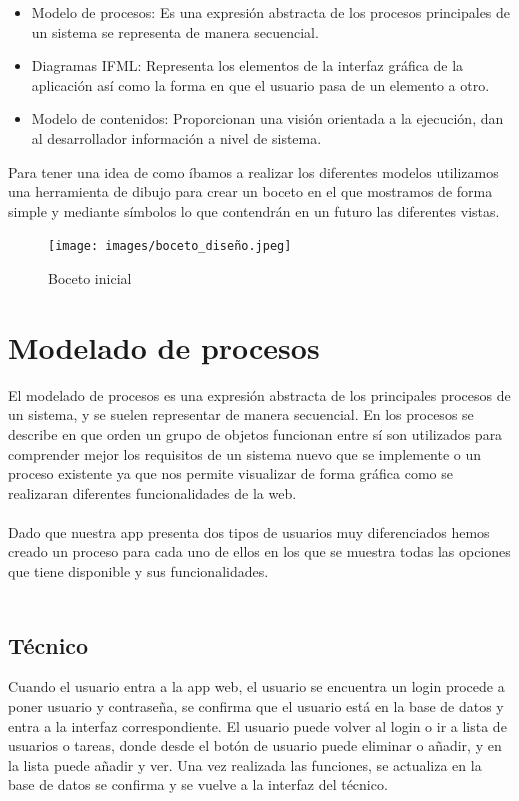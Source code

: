 \documentclass{scrreprt}
\begin{document}
\begin{itemize}
    \item Modelo de procesos: Es una expresión abstracta de los procesos principales de un sistema se representa de manera secuencial.
    \item Diagramas IFML: Representa los elementos de la interfaz gráfica de la aplicación así como la forma en que el usuario pasa de un elemento a otro.
    \item Modelo  de contenidos:  Proporcionan una visión orientada a la ejecución, dan al desarrollador información a nivel de sistema.
\end{itemize}

Para tener una idea de como íbamos a realizar los diferentes modelos utilizamos una herramienta de dibujo para crear un boceto en el que mostramos de forma simple y mediante símbolos lo que contendrán en un futuro las diferentes vistas.

\begin{figure}[H]
	\centering
	\texttt{[image: images/boceto\_diseño.jpeg]}
	\caption{Boceto inicial}
	\label{fig:example1}
\end{figure}

\section{Modelado de procesos}

El modelado de procesos es una expresión abstracta de los principales procesos de un sistema, y se suelen representar de manera secuencial. En los procesos se describe en que orden un grupo de objetos funcionan entre sí son utilizados para comprender mejor los requisitos de un sistema nuevo que se implemente o un proceso existente ya que nos permite visualizar de forma gráfica como se realizaran diferentes funcionalidades de la web. \\
\\
Dado que nuestra app presenta dos tipos de usuarios muy diferenciados hemos creado un proceso para cada uno de ellos en los que se muestra todas las opciones que tiene disponible y sus funcionalidades.\\
\\

\subsection{Técnico}

Cuando el usuario entra a la app web, el usuario se encuentra un login procede a poner usuario y contraseña, se confirma que el usuario está en la base de datos y entra a la interfaz correspondiente. El usuario puede volver al login o ir a lista de usuarios o tareas, donde desde el botón de usuario puede eliminar o añadir, y en la lista puede añadir y ver. Una vez realizada las funciones, se actualiza en la base de datos se confirma y se vuelve a la interfaz del técnico.\\
\end{document}
